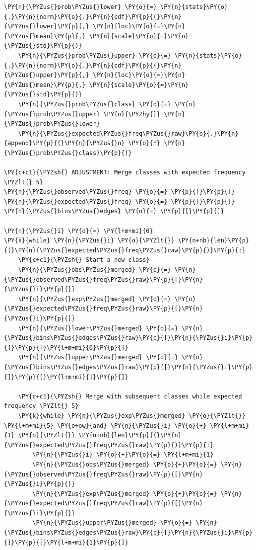 \begin{tcolorbox}[breakable, size=fbox, boxrule=1pt, pad at break*=1mm,colback=cellbackground, colframe=cellborder]
\begin{Verbatim}[commandchars=\\\{\}]
    \PY{n}{\PYZus{}prob\PYZus{}lower} \PY{o}{=} \PY{n}{stats}\PY{o}{.}\PY{n}{norm}\PY{o}{.}\PY{n}{cdf}\PY{p}{(}\PY{n}{\PYZus{}lower}\PY{p}{,} \PY{n}{loc}\PY{o}{=}\PY{n}{\PYZus{}mean}\PY{p}{,} \PY{n}{scale}\PY{o}{=}\PY{n}{\PYZus{}std}\PY{p}{)}
    \PY{n}{\PYZus{}prob\PYZus{}upper} \PY{o}{=} \PY{n}{stats}\PY{o}{.}\PY{n}{norm}\PY{o}{.}\PY{n}{cdf}\PY{p}{(}\PY{n}{\PYZus{}upper}\PY{p}{,} \PY{n}{loc}\PY{o}{=}\PY{n}{\PYZus{}mean}\PY{p}{,} \PY{n}{scale}\PY{o}{=}\PY{n}{\PYZus{}std}\PY{p}{)}
    \PY{n}{\PYZus{}prob\PYZus{}class} \PY{o}{=} \PY{n}{\PYZus{}prob\PYZus{}upper} \PY{o}{\PYZhy{}} \PY{n}{\PYZus{}prob\PYZus{}lower}
    \PY{n}{\PYZus{}expected\PYZus{}freq\PYZus{}raw}\PY{o}{.}\PY{n}{append}\PY{p}{(}\PY{n}{\PYZus{}n} \PY{o}{*} \PY{n}{\PYZus{}prob\PYZus{}class}\PY{p}{)}

\PY{c+c1}{\PYZsh{} ADJUSTMENT: Merge classes with expected frequency \PYZlt{} 5}
\PY{n}{\PYZus{}observed\PYZus{}freq} \PY{o}{=} \PY{p}{[}\PY{p}{]}
\PY{n}{\PYZus{}expected\PYZus{}freq} \PY{o}{=} \PY{p}{[}\PY{p}{]}
\PY{n}{\PYZus{}bins\PYZus{}edges} \PY{o}{=} \PY{p}{[}\PY{p}{]}

\PY{n}{\PYZus{}i} \PY{o}{=} \PY{l+m+mi}{0}
\PY{k}{while} \PY{n}{\PYZus{}i} \PY{o}{\PYZlt{}} \PY{n+nb}{len}\PY{p}{(}\PY{n}{\PYZus{}expected\PYZus{}freq\PYZus{}raw}\PY{p}{)}\PY{p}{:}
    \PY{c+c1}{\PYZsh{} Start a new class}
    \PY{n}{\PYZus{}obs\PYZus{}merged} \PY{o}{=} \PY{n}{\PYZus{}observed\PYZus{}freq\PYZus{}raw}\PY{p}{[}\PY{n}{\PYZus{}i}\PY{p}{]}
    \PY{n}{\PYZus{}exp\PYZus{}merged} \PY{o}{=} \PY{n}{\PYZus{}expected\PYZus{}freq\PYZus{}raw}\PY{p}{[}\PY{n}{\PYZus{}i}\PY{p}{]}
    \PY{n}{\PYZus{}lower\PYZus{}merged} \PY{o}{=} \PY{n}{\PYZus{}bins\PYZus{}edges\PYZus{}raw}\PY{p}{[}\PY{n}{\PYZus{}i}\PY{p}{]}\PY{p}{[}\PY{l+m+mi}{0}\PY{p}{]}
    \PY{n}{\PYZus{}upper\PYZus{}merged} \PY{o}{=} \PY{n}{\PYZus{}bins\PYZus{}edges\PYZus{}raw}\PY{p}{[}\PY{n}{\PYZus{}i}\PY{p}{]}\PY{p}{[}\PY{l+m+mi}{1}\PY{p}{]}

    \PY{c+c1}{\PYZsh{} Merge with subsequent classes while expected frequency \PYZlt{} 5}
    \PY{k}{while} \PY{n}{\PYZus{}exp\PYZus{}merged} \PY{o}{\PYZlt{}} \PY{l+m+mi}{5} \PY{o+ow}{and} \PY{n}{\PYZus{}i} \PY{o}{+} \PY{l+m+mi}{1} \PY{o}{\PYZlt{}} \PY{n+nb}{len}\PY{p}{(}\PY{n}{\PYZus{}expected\PYZus{}freq\PYZus{}raw}\PY{p}{)}\PY{p}{:}
        \PY{n}{\PYZus{}i} \PY{o}{+}\PY{o}{=} \PY{l+m+mi}{1}
        \PY{n}{\PYZus{}obs\PYZus{}merged} \PY{o}{+}\PY{o}{=} \PY{n}{\PYZus{}observed\PYZus{}freq\PYZus{}raw}\PY{p}{[}\PY{n}{\PYZus{}i}\PY{p}{]}
        \PY{n}{\PYZus{}exp\PYZus{}merged} \PY{o}{+}\PY{o}{=} \PY{n}{\PYZus{}expected\PYZus{}freq\PYZus{}raw}\PY{p}{[}\PY{n}{\PYZus{}i}\PY{p}{]}
        \PY{n}{\PYZus{}upper\PYZus{}merged} \PY{o}{=} \PY{n}{\PYZus{}bins\PYZus{}edges\PYZus{}raw}\PY{p}{[}\PY{n}{\PYZus{}i}\PY{p}{]}\PY{p}{[}\PY{l+m+mi}{1}\PY{p}{]}


\end{Verbatim}
\end{tcolorbox}
